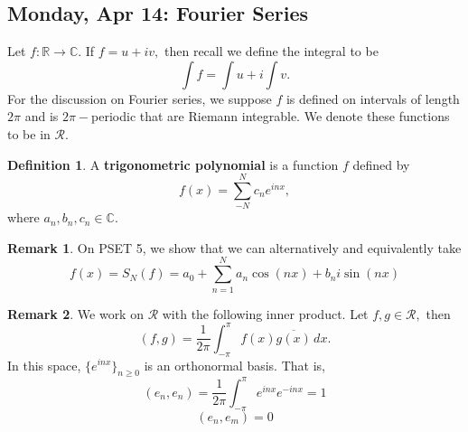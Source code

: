 \documentclass[10pt, oneside]{article}
\newcommand{\bbR}{\mathbb{R}}
\newcommand{\bbC}{\mathbb{C}}
\theoremstyle{definition}
\newtheorem{defn}{Definition}
\newtheorem{rem}{Remark}
\begin{document}
\subsection{Monday, Apr 14: Fourier Series}
Let $f: \bbR \to \bbC.$ If $f = u + iv,$ then recall we define the integral to be 
\[\int f = \int u + i \int v.\] For the discussion on Fourier series, we suppose $f$ is defined on intervals of length $2\pi$ and is $2\pi-$periodic that are Riemann integrable. We denote these functions to be in $\mathcal{R}.$ 
\begin{defn}
    A \textbf{trigonometric polynomial} is a function $f$ defined by 
    \[f(x) = \sum_{-N}^N c_ne^{inx},\] where $a_n, b_n, c_n \in \bbC.$
\end{defn}
\begin{rem}
    On PSET 5, we show that we can alternatively and equivalently take 
    \[f(x) = S_N(f)=  a_0 + \sum_{n=1}^N a_n \cos(nx) + b_n i\sin (nx)\]
\end{rem}
\begin{rem}
    We work on $\mathcal{R}$ with the following inner product. Let $f,g \in \mathcal{R},$ then 
    \[(f,g) = \frac{1}{2\pi}\int_{-\pi}^\pi f(x)\overline{g(x)}\,dx.\] In this space, $\{e^{inx}\}_{n \geq 0}$ is an orthonormal basis. That is, 
    \[(e_n, e_n) = \frac{1}{2\pi}\int_{-\pi}^\pi e^{inx}e^{-inx} = 1\]
    \[(e_n, e_m) = 0\]
\end{rem}
\end{document}
